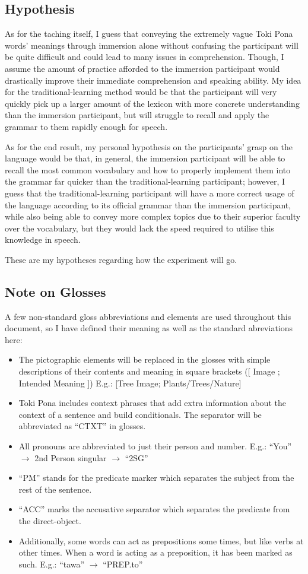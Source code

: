 \documentclass[a4paper,10pt]{article}
\begin{document}
\subsection{Hypothesis}
As for the taching itself, I guess that conveying the extremely vague Toki Pona words' meanings
through immersion alone without confusing the participant will be quite difficult and could lead to
many issues in comprehension. Though, I assume the amount of practice afforded to the immersion
participant would drastically improve their immediate comprehension and speaking ability. My idea
for the traditional-learning method would be that the participant will very quickly pick up a
larger amount of the lexicon with more concrete understanding than the immersion participant, but
will struggle to recall and apply the grammar to them rapidly enough for speech.

As for the end result, my personal hypothesis on the participants' grasp on the language
would be that, in general, the immersion participant will be able to recall the most common vocabulary
and how to properly implement them into the grammar far quicker than the traditional-learning
participant; however, I guess that the traditional-learning participant will have a more correct
usage of the language according to its official grammar than the immersion participant, while also
being able to convey more complex topics due to their superior faculty over the vocabulary, but they
would lack the speed required to utilise this knowledge in speech.

These are my hypotheses regarding how the experiment will go.

\subsection{Note on Glosses}
A few non-standard gloss abbreviations and elements are used
throughout this document, so I have defined their meaning as well as the
standard abreviations here:
\begin{itemize}
 \item The pictographic
 elements will be replaced in the glosses with simple descriptions of their
 contents and meaning in square brackets ([ Image ; Intended Meaning ])
 E.g.: [Tree Image; Plants/Trees/Nature]
 \item Toki Pona includes context phrases that add extra information
 about the context of a sentence and build conditionals. The separator
 will be abbreviated as ``CTXT'' in glosses.
 \item All pronouns are abbreviated to just their person and number.
 E.g.: ``You'' $\rightarrow$ 2nd Person singular $\rightarrow$ ``2SG''
 \item ``PM'' stands for the predicate marker which separates the subject
 from the rest of the sentence.
 \item ``ACC'' marks the accusative separator which separates the predicate
 from the direct-object.
 \item Additionally, some words can act as prepositions some times, but like
 verbs at other times. When a word is acting as a preposition, it has been
 marked as such. E.g.: ``tawa'' $\rightarrow$ ``PREP.to''
\end{itemize}
\end{document}
